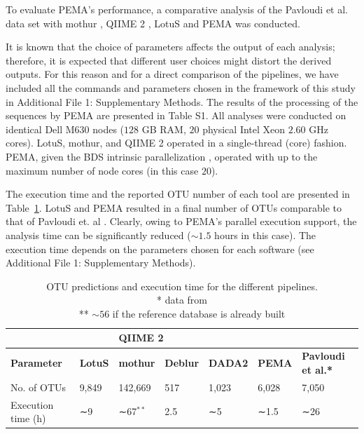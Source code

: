      To evaluate PEMA's performance, a comparative analysis of the Pavloudi et al. \citep{pavloudi2017sediment} data set with mothur \citep{schloss2009introducing}, QIIME 2 \citep{bolyen2018qiime}, LotuS \citep{hildebrand2014lotus} and PEMA was conducted.

      It is known that the choice of parameters affects the output of each analysis; 
      therefore, it is expected that different user choices might distort the derived outputs. 
      For this reason and for a direct comparison of the pipelines, we have included all the commands and parameters chosen in the framework of this study in Additional File 1: Supplementary Methods. 
      The results of the processing of the sequences by PEMA are presented in Table S1. 
      All analyses were conducted on identical Dell M630 nodes ($128$ GB RAM, $20$ physical Intel Xeon $2.60$ GHz cores). 
      LotuS, mothur, and QIIME 2 operated in a single-thread (core) fashion. 
      PEMA, given the BDS intrinsic parallelization \citep{cingolani2015bigdatascript}, operated with up to the maximum number of node cores (in this case $20$).

      The execution time and the reported OTU number of each tool are presented in Table~\ref{table:pema-compare-times}. 
      LotuS and PEMA resulted in a final number of OTUs comparable to that of Pavloudi et. al \citep{pavloudi2017sediment}. 
      Clearly, owing to PEMA's parallel execution support, the analysis time can be significantly reduced ($∼1.5$ hours in this case). 
      The execution time depends on the parameters chosen for each software (see Additional File 1: Supplementary Methods).

      \begin{table}[]
         \begin{tabular}{@{}lllllll@{}}
         \toprule
         \textbf{} & \textbf{} & \multicolumn{2}{l}{\textbf{QIIME 2}} & \textbf{} & \textbf{} &  \\ \midrule
         \textbf{Parameter} & \textbf{LotuS} & \textbf{mothur} & \textbf{Deblur} & \textbf{DADA2} & \textbf{PEMA} & \textbf{Pavloudi et al.*} \\
         No. of OTUs & 9,849 & 142,669 & 517 & 1,023 & 6,028 & 7,050 \\
         Execution time (h) & ∼9 & ∼67$^{**}$  & 2.5 & ∼5 & ∼1.5 & ∼26 \\ \bottomrule
         \end{tabular}
         \caption[OTU predictions and execution time for the different pipelines]{OTU predictions and execution time for the different pipelines. \\ * data from \citep{pavloudi2017sediment} \\ ** $∼56$ if the reference database is already built}
         \label{table:pema-compare-times}
      \end{table}


